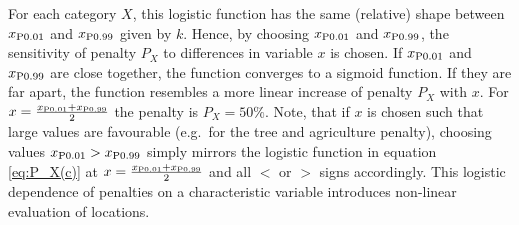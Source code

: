 For each category $X$, this logistic function has the same (relative) shape between $x_{\rm P0.01}$ and $x_{\rm P0.99}$ given by $k$. 
Hence, by choosing $x_{\rm P0.01}$ and $x_{\rm P0.99}$, the sensitivity of penalty $P_X$ to differences in variable $x$ is chosen. 
If $x_{\rm P0.01}$ and $x_{\rm P0.99}$ are close together, the function converges to a sigmoid function. 
If they are far apart, the function resembles a more linear increase of penalty $P_X$ with $x$.
For $x=\frac{x_{\rm P0.01} + x_{\rm P0.99}}{2}$ the penalty is $P_X = 50\%$.
Note, that if $x$ is chosen such that large values are favourable (e.g.\ for the tree and agriculture penalty), choosing values $x_{\rm P0.01}>x_{\rm P0.99}$ simply mirrors the logistic function in equation \ref{eq:P_X(c)} at $x=\frac{x_{\rm P0.01}+x_{\rm P0.99}}{2}$ and all $<$ or $>$ signs accordingly.
This logistic dependence of penalties on a characteristic variable introduces non-linear evaluation of locations.


